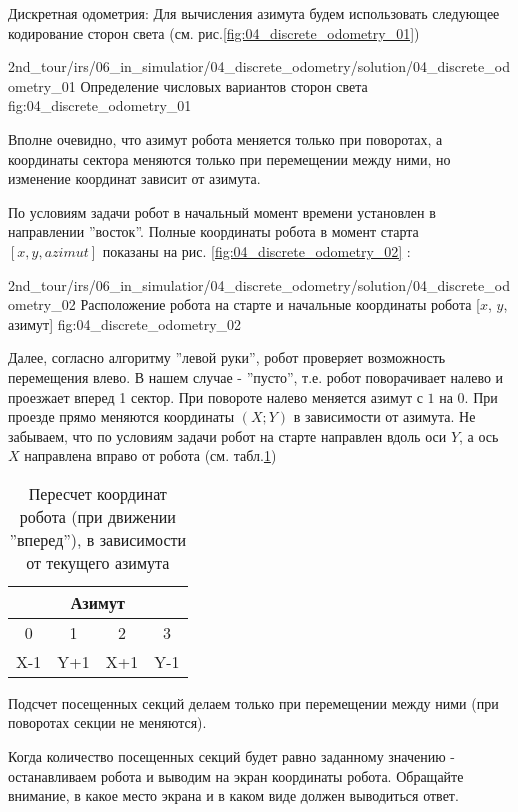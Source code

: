 Дискретная одометрия:
Для вычисления азимута будем использовать следующее кодирование сторон света (см. рис.\ref{fig:04_discrete_odometry_01})

             {2nd_tour/irs/06_in_simulatior/04_discrete_odometry/solution/04_discrete_odometry_01}
             {Определение числовых вариантов сторон света}
             {fig:04_discrete_odometry_01}

Вполне очевидно, что азимут робота меняется только при поворотах, а координаты сектора меняются только при перемещении между ними, но изменение координат зависит от азимута.

По условиям задачи робот в начальный момент времени установлен в направлении ''восток''. Полные координаты робота в момент старта $[x, y, azimut]$ показаны на рис. \ref{fig:04_discrete_odometry_02} :

             {2nd_tour/irs/06_in_simulatior/04_discrete_odometry/solution/04_discrete_odometry_02}
             {Расположение робота на старте и начальные координаты робота [$x$, $y$, азимут]}
             {fig:04_discrete_odometry_02}

Далее, согласно алгоритму ''левой руки'', робот проверяет возможность перемещения влево. В нашем случае - ''пусто'', т.е. робот поворачивает налево и проезжает вперед 1 сектор.
При повороте налево меняется азимут с $1$ на $0$.
При проезде прямо меняются координаты $(X; Y)$ в зависимости от азимута.
Не забываем, что по условиям задачи робот на старте направлен вдоль оси $Y$, а ось $X$ направлена вправо от робота (см. табл.\ref{table:azimut})
\begin{table}
	\begin{center}
		\begin{tabular}{|c|c|c|c|}
			\hline 
			\multicolumn{4}{|c|}{\textbf{Азимут}} \\ 
			\hline 
			0 & 1 & 2 & 3 \\ 
			\hline 
			X-1 & Y+1 & X+1 & Y-1 \\ 
			\hline 
		\end{tabular}
		\caption{Пересчет координат робота (при движении ''вперед''), в зависимости от текущего азимута}
		\label{table:azimut}
	\end{center}
\end{table}

Подсчет посещенных секций делаем только при перемещении между ними (при поворотах секции не меняются).

Когда количество посещенных секций будет равно заданному значению - останавливаем робота и выводим на экран координаты робота. 
Обращайте внимание, в какое место экрана и в каком виде должен выводиться ответ.

